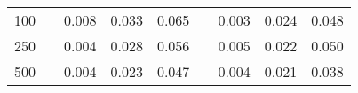 % 
\begin{tabular}{ccccccccc}
  \hline
  \hline
100 &  & 0.008 & 0.033 & 0.065 &  & 0.003 & 0.024 & 0.048 \\ 
  250 &  & 0.004 & 0.028 & 0.056 &  & 0.005 & 0.022 & 0.050 \\ 
  500 &  & 0.004 & 0.023 & 0.047 &  & 0.004 & 0.021 & 0.038 \\ 
   \hline
\end{tabular}

